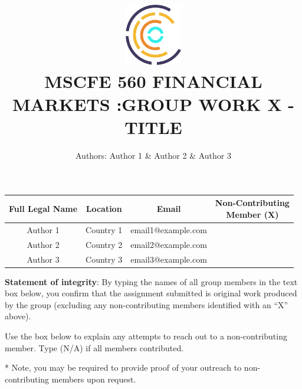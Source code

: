 \documentclass[mla8]{mla}
\title{\includegraphics[width=2.5cm]{WQU_Radial-Icon_FullColor_RGB.png}\\[0.5cm]\MakeUppercase{MScFE 560 Financial Markets :\newline Group Work x - Title}}
\author{Authors: Author 1 {\&} Author 2 {\&} Author 3}
\date{\mladate} %
\begin{document}
 


\immediate{}
\immediate{}
\immediate{}

\begin{paper}

\bigskip

\begin{center}
\begin{tabular}{ |c|c|c|c|}
 \hline
 \textbf{Full Legal Name} & \textbf{Location} & \textbf{Email} &%
 \shortstack{\textbf{Non-Contributing} \\ \textbf{Member (X)}}\\ 
 \hline
 Author 1 & Country 1 & email1@example.com &\\  
 Author 2 & Country 2 & email2@example.com &\\  
 Author 3 & Country 3 & email3@example.com &\\  
 \hline
\end{tabular}
\end{center}

\bigskip
\begin{footnotesize}
\noindent\textbf{Statement of integrity}: By typing the names of all group members in the text box below, you confirm that the assignment submitted is original work produced by the group (excluding any non-contributing members identified with an “X” above).
\end{footnotesize}

\begin{wqubox} %
\end{wqubox}

\noindent Use the box below to explain any attempts to reach out to a non-contributing member. Type (N/A) if all members contributed.

\begin{wqubox} %
\end{wqubox}
* Note, you may be required to provide proof of your outreach to non-contributing members upon request.


\end{paper}
\end{document}
